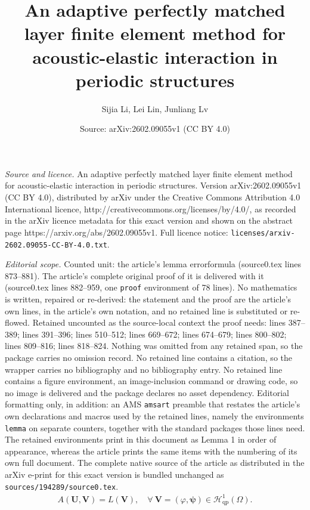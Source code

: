 \documentclass[10pt,a4paper]{amsart}
\title{An adaptive perfectly matched layer finite element method for acoustic-elastic interaction in periodic structures}
\author{Sijia Li, Lei Lin, Junliang Lv}
\date{Source: arXiv:2602.09055v1 (CC BY 4.0)}
\begin{document}
\maketitle

\noindent\emph{Source and licence.} An adaptive perfectly matched layer finite element method for acoustic-elastic interaction in periodic structures. Version arXiv:2602.09055v1 (CC BY 4.0), distributed by arXiv under the Creative Commons Attribution 4.0 International licence, http://creativecommons.org/licenses/by/4.0/, as recorded in the arXiv licence metadata for this exact version and shown on the abstract page https://arxiv.org/abs/2602.09055v1. Full licence notice: \texttt{licenses/arxiv-2602.09055-CC-BY-4.0.txt}.\par\smallskip

\noindent\textit{Editorial scope.} Counted unit: the article's lemma errorformula (source0.tex lines 873--881). The article's complete original proof of it is delivered with it (source0.tex lines 882--959, one \texttt{proof} environment of 78 lines). No mathematics is written, repaired or re-derived: the statement and the proof are the article's own lines, in the article's own notation, and no retained line is substituted or re-flowed.  Retained uncounted as the source-local context the proof needs: lines 387--389; lines 391--396; lines 510--512; lines 669--672; lines 674--679; lines 800--802; lines 809--816; lines 818--824.  Nothing was omitted from any retained span, so the package carries no omission record.  No retained line contains a citation, so the wrapper carries no bibliography and no bibliography entry.  No retained line contains a figure environment, an image-inclusion command or drawing code, so no image is delivered and the package declares no asset dependency.  Editorial formatting only, in addition: an AMS \texttt{amsart} preamble that restates the article's own declarations and macros used by the retained lines, namely the environments \texttt{lemma} on separate counters, together with the standard packages those lines need.  The retained environments print in this document as Lemma 1 in order of appearance, whereas the article prints the same items with the numbering of its own full document.  The complete native source of the article as distributed in the arXiv e-print for this exact version is bundled unchanged as \texttt{sources/194289/source0.tex}.
\begin{align}\label{DtN varproblem}
	A(\boldsymbol{U}, \boldsymbol{V})=L(\boldsymbol{V}),\quad \forall~ \boldsymbol{V}=(\varphi, \boldsymbol{\psi}) \in \mathscr{H}^1_\mathrm{qp}(\Omega).
\end{align}
\end{document}

